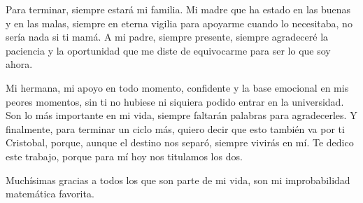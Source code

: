 Para terminar, siempre estará mi familia. Mi madre que ha estado en las buenas y en las malas, siempre en eterna vigilia para apoyarme cuando lo necesitaba, no sería nada si ti mamá. A mi padre,  siempre presente, siempre agradeceré la paciencia y la oportunidad que me diste de equivocarme para ser lo que soy ahora.

Mi hermana, mi apoyo en todo momento, confidente y la base emocional en mis peores momentos, sin ti no hubiese ni siquiera podido entrar en la universidad. Son lo más importante en mi vida, siempre faltarán palabras para agradecerles. Y finalmente, para terminar un ciclo más, quiero decir que esto también va por ti Cristobal, porque, aunque el destino nos separó, siempre vivirás en mí. Te dedico este trabajo, porque para mí hoy nos titulamos los dos.

Muchísimas gracias a todos los que son parte de mi vida, son mi improbabilidad matemática favorita.